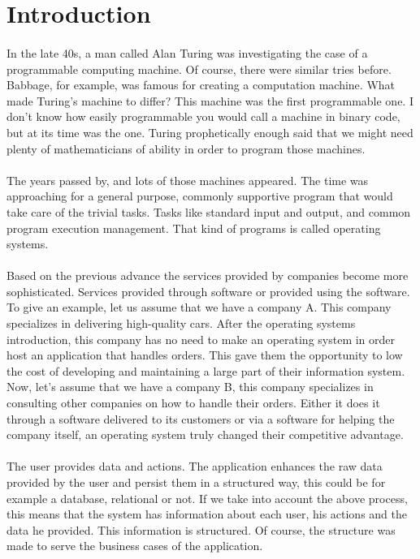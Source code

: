 \newpage

\twocolumn
\section{Introduction}
\paragraph{} In the late 40s, a man called Alan Turing was investigating the case of a programmable computing machine. Of course, there were similar tries before. Babbage, for example, was famous for creating a computation machine. What made Turing's machine to differ? This machine was the first programmable one. I don't know how easily programmable you would call a machine in binary code, but at its time was the one. Turing prophetically enough said that we might need plenty of mathematicians of ability in order to program those machines.

\paragraph{} The years passed by, and lots of those machines appeared. The time was approaching for a general purpose, commonly supportive program that would take care of the trivial tasks. Tasks like standard input and output, and common program execution management. That kind of programs is called operating systems.

\paragraph{} Based on the previous advance the services provided by companies become more sophisticated. Services provided through software or provided using the software. To give an example, let us assume that we have a company A. This company specializes in delivering high-quality cars. After the operating systems introduction, this company has no need to make an operating system in order host an application that handles orders. This gave them the opportunity to low the cost of developing and maintaining a large part of their information system. Now, let's assume that we have a company B, this company specializes in consulting other companies on how to handle their orders. Either it does it through a software delivered to its customers or via a software for helping the company itself, an operating system truly changed their competitive advantage.

\paragraph{} The user provides data and actions. The application enhances the raw data provided by the user and persist them in a structured way, this could be for example a database, relational or not. If we take into account the above process, this means that the system has information about each user, his actions and the data he provided. This information is structured. Of course, the structure was made to serve the business cases of the application.


